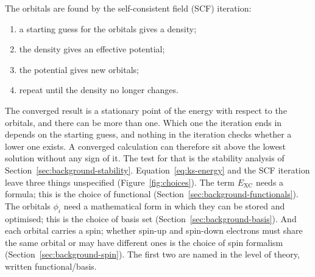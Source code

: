 The orbitals are found by the self-consistent field (SCF) iteration:

\begin{enumerate}
  \item a starting guess for the orbitals gives a density;
  \item the density gives an effective potential;
  \item the potential gives new orbitals;
  \item repeat until the density no longer changes.
\end{enumerate}

The converged result is a stationary point of the energy with respect
to the orbitals, and there can be more than one. Which one the
iteration ends in depends on the starting guess, and nothing in the
iteration checks whether a lower one exists. A converged calculation
can therefore sit above the lowest solution without any sign of it.
The test for that is the stability analysis of
Section~\ref{sec:background-stability}.
Equation~\eqref{eq:ks-energy} and the SCF iteration leave three things
unspecified (Figure~\ref{fig:choices}). The term $E_\text{XC}$ needs a formula; this is the choice of
functional (Section~\ref{sec:background-functionals}). The orbitals
$\phi_i$ need a mathematical form in which they can be stored and
optimised; this is the choice of basis set
(Section~\ref{sec:background-basis}). And each orbital carries a spin;
whether spin-up and spin-down electrons must share the same orbital or may
have different ones is the choice of spin formalism
(Section~\ref{sec:background-spin}). The first two are named in the level
of theory, written functional/basis. 

